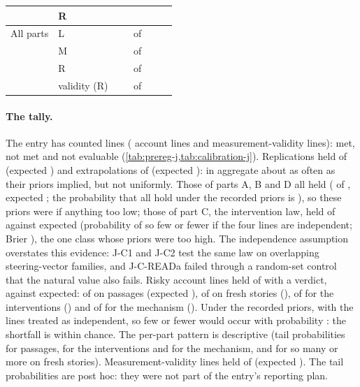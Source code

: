 \begin{table}[!ht]
\begin{tabular}{@{}llcccccc@{}}
 & R & \JdClassRLines{} & \JdClassRMet{} & \JdClassRNotMet{} & \JdClassRNotEval{} & \JdClassRExp{} & \JdClassRBrier{} \\
\midrule
All parts & L & & \multicolumn{3}{c}{\JxClassLMetABCD{} of \JxClassLVerdABCD{}} & \JxClassLExpABCD{} & \\
 & M & & \multicolumn{3}{c}{\JxClassMMetABCD{} of \JxClassMVerdABCD{}} & \JxClassMExpABCD{} & \\
 & R & & \multicolumn{3}{c}{\JxRiskyMetABCD{} of \JxRiskyVerdABCD{}} & \JxRiskyExpABCD{} & \\
 & validity (R) & & \multicolumn{3}{c}{\JxClassValMetABCD{} of \JxClassValVerdABCD{}} & \JxClassValExpABCD{} & \\
\bottomrule
\end{tabular}
\end{table}

\paragraph{The tally.} The entry has \JxLinesABCD{} counted lines (\JxAccountLinesABCD{} account lines and \JxClassValVerdABCD{} measurement-validity lines): \JxMetABCD{} met, \JxNotMetABCD{} not met and \JxNotEvalABCD{} not evaluable (\cref{tab:prereg-j,tab:calibration-j}). Replications held \JxClassLMetABCD{} of \JxClassLVerdABCD{} (expected \JxClassLExpABCD{}) and extrapolations \JxClassMMetABCD{} of \JxClassMVerdABCD{} (expected \JxClassMExpABCD{}): in aggregate about as often as their priors implied, but not uniformly. Those of parts A, B and D all held (\JxClassMMetABD{} of \JxClassMVerdABD{}, expected \JxClassMExpABD{}; the probability that all hold under the recorded priors is \JxClassMTailPABD{}), so these priors were if anything too low; those of part C, the intervention law, held \JcClassMMet{} of \JcClassMLines{} against \JcClassMExp{} expected (probability of so few or fewer \JcClassMTailP{} if the four lines are independent; Brier \JcClassMBrier{}), the one class whose priors were too high. The independence assumption overstates this evidence: J-C1 and J-C2 test the same law on overlapping steering-vector families, and J-C-READa failed through a random-set control that the natural value also fails. Risky account lines held \JxRiskyMetABCD{} of \JxRiskyVerdABCD{} with a verdict, against \JxRiskyExpABCD{} expected: \JxRiskyMetA{} of \JxRiskyVerdA{} on passages (expected \JxRiskyExpA{}), \JxRiskyMetB{} of \JxRiskyVerdB{} on fresh stories (\JxRiskyExpB{}), \JxRiskyMetC{} of \JxRiskyVerdC{} for the interventions (\JxRiskyExpC{}) and \JxRiskyMetD{} of \JxRiskyVerdD{} for the mechanism (\JxRiskyExpD{}). Under the recorded priors, with the lines treated as independent, so few or fewer would occur with probability \JxRiskyTailP{}: the shortfall is within chance. The per-part pattern is descriptive (tail probabilities \JxRiskyTailPA{} for passages, \JxRiskyTailPC{} for the interventions and \JxRiskyTailPD{} for the mechanism, and \JxRiskyTailPB{} for so many or more on fresh stories). Measurement-validity lines held \JxClassValMetABCD{} of \JxClassValVerdABCD{} (expected \JxClassValExpABCD{}). The tail probabilities are post hoc: they were not part of the entry's reporting plan.

